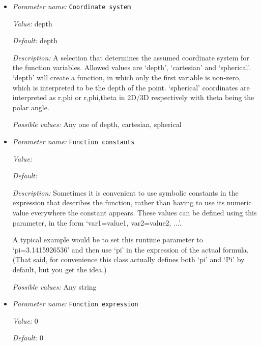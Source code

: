 \begin{itemize}
\item {\it Parameter name:} {\tt Coordinate system}
\label{parameters:Mesh refinement/Minimum refinement function/Coordinate system}


{\it Value:} depth


{\it Default:} depth


{\it Description:} A selection that determines the assumed coordinate system for the function variables. Allowed values are `depth', `cartesian' and `spherical'. `depth' will create a function, in which only the first variable is non-zero, which is interpreted to be the depth of the point. `spherical' coordinates are interpreted as r,phi or r,phi,theta in 2D/3D respectively with theta being the polar angle.


{\it Possible values:} Any one of depth, cartesian, spherical
\item {\it Parameter name:} {\tt Function constants}
\label{parameters:Mesh refinement/Minimum refinement function/Function constants}


{\it Value:} 


{\it Default:} 


{\it Description:} Sometimes it is convenient to use symbolic constants in the expression that describes the function, rather than having to use its numeric value everywhere the constant appears. These values can be defined using this parameter, in the form `var1=value1, var2=value2, ...'.

A typical example would be to set this runtime parameter to `pi=3.1415926536' and then use `pi' in the expression of the actual formula. (That said, for convenience this class actually defines both `pi' and `Pi' by default, but you get the idea.)


{\it Possible values:} Any string
\item {\it Parameter name:} {\tt Function expression}
\label{parameters:Mesh refinement/Minimum refinement function/Function expression}


{\it Value:} 0


{\it Default:} 0



\end{itemize}
